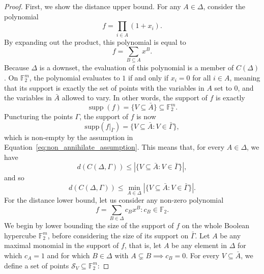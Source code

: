 \documentclass{article}
\DeclareMathOperator{\supp}{supp}
\begin{document}
\begin{proof}
    First, we show the distance upper bound. For any $A \in \Delta$, consider the polynomial
    \begin{equation}
        f = \prod_{i \in A}(1+x_i).
    \end{equation}
    By expanding out the product, this polynomial is equal to
    \begin{equation}
        f = \sum_{B \subseteq A} x^B.
    \end{equation}
    Because $\Delta$ is a downset, the evaluation of this polynomial is a member of $C(\Delta)$. On $\mathbb{F}_2^m$, the polynomial evaluates to $1$ if and only if $x_i = 0$ for all $i \in A$, meaning that its support is exactly the set of points with the variables in $A$ set to $0$, and the variables in $\bar{A}$ allowed to vary. In other words, the support of $f$ is exactly
    \begin{equation}
        \supp(f) = \{V \subseteq \bar{A}\} \subseteq \mathbb{F}_2^m.
    \end{equation}
    Puncturing the points $\Gamma$, the support of $f$ is now
    \begin{equation}
        \text{supp}(f|_{\bar{\Gamma}}) = \{V \subseteq \bar{A}: V \in \bar{\Gamma}\},
    \end{equation}
    which is non-empty by the assumption in Equation~\eqref{eq:non_annihilate_assumption}.
    This means that, for every $A \in \Delta$, we have
    \begin{equation}
        d(C(\Delta, \Gamma)) \leq |\{V \subseteq \bar{A}: V \in \bar{\Gamma}\}|,
    \end{equation}
    and so
    \begin{equation}
        d(C(\Delta, \Gamma)) \leq \min_{A \in \Delta}|\{V \subseteq \bar{A}: V \in \bar{\Gamma}\}|.
    \end{equation}
    For the distance lower bound, let us consider any non-zero polynomial
    \begin{equation}
        f = \sum_{B \in \Delta}c_Bx^B: c_B \in \mathbb{F}_2.
    \end{equation}
    We begin by lower bounding the size of the support of $f$ on the whole Boolean hypercube $\mathbb{F}_2^m$, before considering the size of its support on $\bar{\Gamma}$.
    Let $A$ be any maximal monomial in the support of $f$, that is, let $A$ be any element in $\Delta$ for which $c_A = 1$ and for which $B \in \Delta$ with $A \subsetneq B \implies c_B = 0$. For every $V \subseteq \bar{A}$, we define a set of points $\mathcal{S}_V \subseteq \mathbb{F}_2^m$:

\end{proof}
\end{document}
